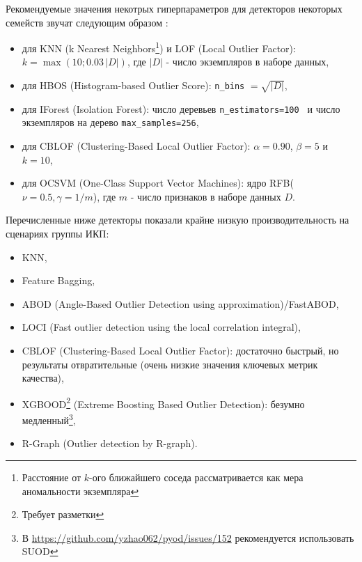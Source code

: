 \documentclass[%
	11pt,
	a4paper,
	utf8,
		]{article}
\begin{document}
Рекомендуемые значения некотрых гиперпараметров для детекторов некоторых семейств звучат следующим образом \cite{soenen:effect-hyper-param-tuning:2021}:
\begin{itemize}
	\item для KNN (k Nearest Neighbors\footnote{Расстояние от $ k $-ого ближайшего соседа рассматривается как мера аномальности экземпляра}) и LOF (Local Outlier Factor): $ k = \max (10; 0.03 \, |D|) $, где $ |D| $ - число экземпляров в наборе данных,
	
	\item для HBOS (Histogram-based Outlier Score): \texttt{n\_bins} $ = \sqrt{|D|} $,
	
	\item для IForest (Isolation Forest): число деревьев \texttt{n\_estimators=100 } и число экземпляров на дерево \texttt{max\_samples=256},
	
	\item для CBLOF (Clustering-Based Local Outlier Factor): $ \alpha = 0.90 $, $ \beta = 5 $ и $ k = 10 $,
	
	\item для OCSVM (One-Class Support Vector Machines): ядро RFB($ \nu = 0.5, \gamma = 1/m $), где $ m $ - число признаков в наборе данных $ D $.
\end{itemize}
\vspace*{2mm}

Перечисленные ниже детекторы показали крайне низкую производительность на сценариях группы ИКП: 
\begin{itemize}
	\item KNN,
	
	\item Feature Bagging,
	
	\item ABOD (Angle-Based Outlier Detection using approximation)/FastABOD,
	
	\item LOCI (Fast outlier detection using the local correlation integral),
	
	\item CBLOF (Clustering-Based Local Outlier Factor): достаточно быстрый, но результаты отвратительные (очень низкие значения ключевых метрик качества),
	
	\item XGBOOD\footnote{Требует разметки} (Extreme Boosting Based Outlier Detection): безумно медленный\footnote{В \url{https://github.com/yzhao062/pyod/issues/152} рекомендуется использовать SUOD},
	
	\item R-Graph (Outlier detection by R-graph).
\end{itemize}
\vspace*{2mm}
\end{document}
